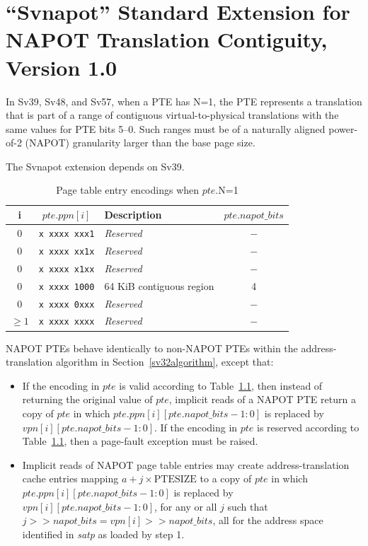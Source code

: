 \chapter{``Svnapot'' Standard Extension for NAPOT Translation Contiguity, Version 1.0}
\label{svnapot}

In Sv39, Sv48, and Sv57, when a PTE has N=1, the PTE represents a
translation that is part of a range of contiguous virtual-to-physical
translations with the same values for PTE bits 5--0.  Such ranges must be of a
naturally aligned power-of-2 (NAPOT) granularity larger than the base page
size.

The Svnapot extension depends on Sv39.

\begin{table}[h!]
\begin{center}
\begin{tabular}{|c|c||l|c|}
\hline
i        & $pte.ppn[i]$      & Description              & $pte.napot\_bits$ \\
\hline
0        & {\tt x~xxxx~xxx1} & {\em Reserved}           & $-$ \\
0        & {\tt x~xxxx~xx1x} & {\em Reserved}           & $-$ \\
0        & {\tt x~xxxx~x1xx} & {\em Reserved}           & $-$ \\
0        & {\tt x~xxxx~1000} & 64 KiB contiguous region & 4   \\
0        & {\tt x~xxxx~0xxx} & {\em Reserved}           & $-$ \\
$\geq 1$ & {\tt x~xxxx~xxxx} & {\em Reserved}           & $-$ \\
\hline
\end{tabular}
\end{center}
\caption{Page table entry encodings when $pte$.N=1}
\label{ptenapot}
\end{table}

NAPOT PTEs behave identically to non-NAPOT PTEs within the address-translation
algorithm in Section~\ref{sv32algorithm}, except that:
\begin{itemize}
  \item If the encoding in $pte$ is valid according to Table~\ref{ptenapot},
    then instead of returning the original value of $pte$, implicit reads of a
    NAPOT PTE return a copy of $pte$ in which $pte.ppn[i][pte.napot\_bits-1:0]$ is
    replaced by $vpn[i][pte.napot\_bits-1:0]$.  If the encoding in $pte$ is
    reserved according to Table~\ref{ptenapot}, then a page-fault exception
    must be raised.
  \item Implicit reads of NAPOT page table entries may create address-translation cache
    entries mapping $a + j \times \textrm{PTESIZE}$ to a copy of $pte$
    in which $pte.ppn[i][pte.napot\_bits-1:0]$ is replaced by
    $vpn[i][pte.napot\_bits-1:0]$, for any or all $j$ such that
    ${j >> napot\_bits}={vpn[i] >> napot\_bits}$, all for the address space identified
    in {\em satp} as loaded by step 1.
\end{itemize}

